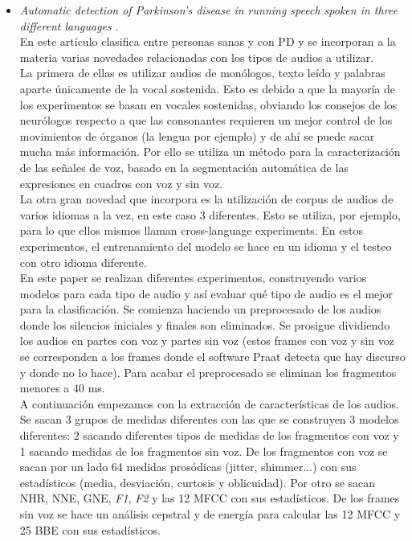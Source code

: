 \begin{itemize}
	\item \textit{Automatic detection of Parkinson’s disease in running speech spoken in three different languages} \cite{Orz2016}.\\
	En este artículo clasifica entre personas sanas y con PD y se incorporan a la materia varias novedades relacionadas con los tipos de audios a utilizar.\\ 
	La primera de ellas es utilizar audios de monólogos, texto leído y palabras aparte únicamente de la vocal sostenida. Esto es debido a que la mayoría de los experimentos se basan en vocales sostenidas, obviando los consejos de los neurólogos respecto a que las consonantes requieren un mejor control de los movimientos de órganos (la lengua por ejemplo) y de ahí se puede sacar mucha más información. Por ello se utiliza un método para la caracterización de las señales de voz, basado en la segmentación automática de las expresiones en cuadros con voz y sin voz.\\
	La otra gran novedad que incorpora es la utilización de corpus de audios de varios idiomas a la vez, en este caso 3 diferentes. Esto se utiliza, por ejemplo, para lo que ellos mismos llaman cross-language experiments. En estos experimentos, el entrenamiento del modelo se hace en un idioma y el testeo con otro idioma diferente.\\
	En este paper se realizan diferentes experimentos, construyendo varios modelos para cada tipo de audio y así evaluar qué tipo de audio es el mejor para la clasificación. Se comienza haciendo un preprocesado de los audios donde los silencios iniciales y finales son eliminados. Se prosigue dividiendo los audios en partes con voz y partes sin voz (estos frames con voz y sin voz se corresponden a los frames donde el software Praat detecta que hay discurso y donde no lo hace). Para acabar el preprocesado se eliminan los fragmentos menores a 40 ms.\\ 
	A continuación empezamos con la extracción de características de los audios. Se sacan 3 grupos de medidas diferentes con las que se construyen 3 modelos diferentes: 2 sacando diferentes tipos de medidas de los fragmentos con voz y 1 sacando medidas de los fragmentos sin voz. De los fragmentos con voz se sacan por un lado 64 medidas prosódicas (jitter, shimmer...) con sus estadísticos (media, desviación, curtosis y oblicuidad). Por otro se sacan NHR, NNE, GNE, \textit{F1}, \textit{F2} y las 12 MFCC con sus estadísticos. De los frames sin voz se hace un análisis cepstral y de energía para calcular las 12 MFCC y 25 BBE con sus estadísticos. \\

\end{itemize}
